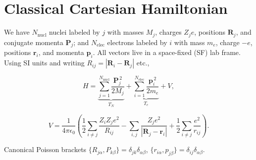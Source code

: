 \section{Classical Cartesian Hamiltonian}

We have $N_{\mathrm{nucl}}$ nuclei labeled by $j$ with masses $M_j$, charges $Z_j e$, positions $\mathbf{R}_j$, and conjugate momenta $\mathbf{P}_j$; and $N_{\mathrm{elec}}$ electrons labeled by $i$ with mass $m_e$, charge $-e$, positions $\mathbf{r}_i$, and momenta $\mathbf{p}_i$. All vectors live in a space-fixed (SF) lab frame. Using SI units and writing $R_{ij}=|\mathbf{R}_i-\mathbf{R}_j|$ etc.,

\begin{equation}
H = \underbrace{\sum_{j=1}^{N_{\mathrm{nucl}}}\frac{\mathbf{P}_j^{\,2}}{2M_j}}_{T_N} + \underbrace{\sum_{i=1}^{N_{\mathrm{elec}}}\frac{\mathbf{p}_i^{\,2}}{2m_e}}_{T_e} + V, \tag{1.1}
\end{equation}

\begin{equation}
V = \frac{1}{4\pi\epsilon_0}\left(\frac12\sum_{i\ne j}\frac{Z_i Z_j e^2}{R_{ij}} - \sum_{i,j}\frac{Z_j e^2}{|\mathbf{R}_j-\mathbf{r}_i|} + \frac12\sum_{i\ne j}\frac{e^2}{r_{ij}}\right). \tag{1.2}
\end{equation}

Canonical Poisson brackets $\{R_{j\alpha},P_{k\beta}\}=\delta_{jk}\delta_{\alpha\beta}$, $\{r_{i\alpha},p_{j\beta}\}=\delta_{ij}\delta_{\alpha\beta}$.
